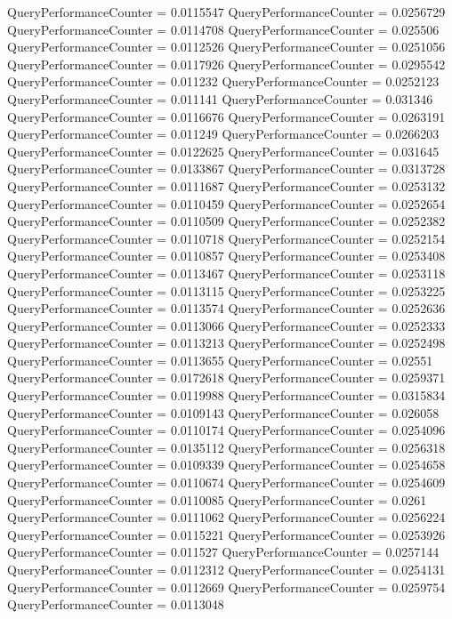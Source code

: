 \documentclass[9pt]{article}
\theoremstyle{plain}
\theoremstyle{definition}
\theoremstyle{remark}
\numberwithin{equation}{section}
\begin{document}
QueryPerformanceCounter  =  0.0115547
QueryPerformanceCounter  =  0.0256729
QueryPerformanceCounter  =  0.0114708
QueryPerformanceCounter  =  0.025506
QueryPerformanceCounter  =  0.0112526
QueryPerformanceCounter  =  0.0251056
QueryPerformanceCounter  =  0.0117926
QueryPerformanceCounter  =  0.0295542
QueryPerformanceCounter  =  0.011232
QueryPerformanceCounter  =  0.0252123
QueryPerformanceCounter  =  0.011141
QueryPerformanceCounter  =  0.031346
QueryPerformanceCounter  =  0.0116676
QueryPerformanceCounter  =  0.0263191
QueryPerformanceCounter  =  0.011249
QueryPerformanceCounter  =  0.0266203
QueryPerformanceCounter  =  0.0122625
QueryPerformanceCounter  =  0.031645
QueryPerformanceCounter  =  0.0133867
QueryPerformanceCounter  =  0.0313728
QueryPerformanceCounter  =  0.0111687
QueryPerformanceCounter  =  0.0253132
QueryPerformanceCounter  =  0.0110459
QueryPerformanceCounter  =  0.0252654
QueryPerformanceCounter  =  0.0110509
QueryPerformanceCounter  =  0.0252382
QueryPerformanceCounter  =  0.0110718
QueryPerformanceCounter  =  0.0252154
QueryPerformanceCounter  =  0.0110857
QueryPerformanceCounter  =  0.0253408
QueryPerformanceCounter  =  0.0113467
QueryPerformanceCounter  =  0.0253118
QueryPerformanceCounter  =  0.0113115
QueryPerformanceCounter  =  0.0253225
QueryPerformanceCounter  =  0.0113574
QueryPerformanceCounter  =  0.0252636
QueryPerformanceCounter  =  0.0113066
QueryPerformanceCounter  =  0.0252333
QueryPerformanceCounter  =  0.0113213
QueryPerformanceCounter  =  0.0252498
QueryPerformanceCounter  =  0.0113655
QueryPerformanceCounter  =  0.02551
QueryPerformanceCounter  =  0.0172618
QueryPerformanceCounter  =  0.0259371
QueryPerformanceCounter  =  0.0119988
QueryPerformanceCounter  =  0.0315834
QueryPerformanceCounter  =  0.0109143
QueryPerformanceCounter  =  0.026058
QueryPerformanceCounter  =  0.0110174
QueryPerformanceCounter  =  0.0254096
QueryPerformanceCounter  =  0.0135112
QueryPerformanceCounter  =  0.0256318
QueryPerformanceCounter  =  0.0109339
QueryPerformanceCounter  =  0.0254658
QueryPerformanceCounter  =  0.0110674
QueryPerformanceCounter  =  0.0254609
QueryPerformanceCounter  =  0.0110085
QueryPerformanceCounter  =  0.0261
QueryPerformanceCounter  =  0.0111062
QueryPerformanceCounter  =  0.0256224
QueryPerformanceCounter  =  0.0115221
QueryPerformanceCounter  =  0.0253926
QueryPerformanceCounter  =  0.011527
QueryPerformanceCounter  =  0.0257144
QueryPerformanceCounter  =  0.0112312
QueryPerformanceCounter  =  0.0254131
QueryPerformanceCounter  =  0.0112669
QueryPerformanceCounter  =  0.0259754
QueryPerformanceCounter  =  0.0113048
\end{document}
